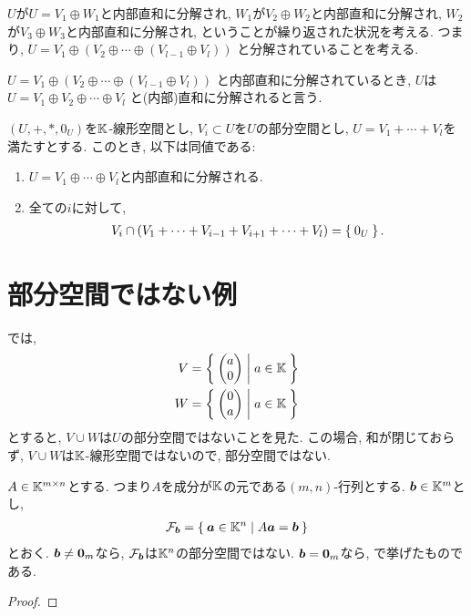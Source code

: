 $U$が$U=V_1\oplus W_1$と内部直和に分解され,
$W_1$が$V_2\oplus W_2$と内部直和に分解され,
$W_2$が$V_3\oplus W_3$と内部直和に分解され,
ということが繰り返された状況を考える.
つまり,
$U=V_1\oplus (V_2\oplus \cdots \oplus(V_{l-1}\oplus V_l))$
と分解されていることを考える.
\begin{definition}
$U=V_1\oplus (V_2\oplus \cdots \oplus(V_{l-1}\oplus V_l))$
と内部直和に分解されているとき,
$U$は$U=V_1\oplus V_2\oplus \cdots \oplus V_l$
と(内部)直和に分解されると言う.
\end{definition}
\begin{prop}
  $(U,\plus,\ast,0_U)$を$\mathbb{K}$-線形空間とし, $V_i\subset U$を$U$の部分空間とし,
  $U=V_1+\cdots+ V_l$を満たすとする.
  このとき, 以下は同値である:
  \begin{enumerate}
  \item $U=V_1\oplus \cdots \oplus V_l$と内部直和に分解される.
  \item 全ての$i$に対して,
    \begin{align*}
      V_i \cap (V_1+\cdots+ V_{i-1}+V_{i+1}+\cdots+ V_{l})=\Set{0_U}.
    \end{align*}
  \end{enumerate}
\end{prop}


\section{部分空間ではない例}
\label{sec:subspace:non}

\begin{example}
  では,
  \begin{align*}
    V&=\Set{\begin{pmatrix}a\\0\end{pmatrix}|a\in\mathbb{K}}\\
    W&=\Set{\begin{pmatrix}0\\a\end{pmatrix}|a\in\mathbb{K}}
  \end{align*}
  とすると, $V\cup W$は$U$の部分空間ではないことを見た.
  この場合, 和が閉じておらず, $V\cup W$は$\mathbb{K}$-線形空間ではないので,
  部分空間ではない.
\end{example}

\begin{example}
  \label{subsp:nonexample:fiber}
  $A\in \mathbb{K}^{m\times n}$とする.
  つまり$A$を成分が$\mathbb{K}$の元である$(m,n)$-行列とする.
  $\boldsymbol{b}\in \mathbb{K}^m$とし,
  \begin{align*}
    \mathcal{F}_{\boldsymbol{b}}=\Set{\boldsymbol{a}\in \mathbb{K}^n|A\boldsymbol{a}=\boldsymbol{b}}
  \end{align*}
  とおく.
  $\boldsymbol{b}\neq \boldsymbol{0}_m$なら,
  $\mathcal{F}_{\boldsymbol{b}}$は$\mathbb{K}^n$の部分空間ではない.
  $\boldsymbol{b}= \boldsymbol{0}_m$なら,
  で挙げたものである.
\end{example}
\begin{proof}\end{proof}



